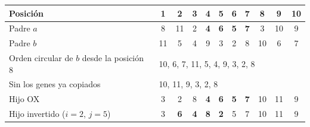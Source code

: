 \begin{tabular}{l*{10}{c}}\toprule
Posición & 1 & 2 & 3 & 4 & 5 & 6 & 7 & 8 & 9 & 10\\\midrule
Padre $a$ & 8 & 11 & 2 & \textbf{4} & \textbf{6} & \textbf{5} & \textbf{7} & 3 & 10 & 9\\
Padre $b$ & 11 & 5 & 4 & 9 & 3 & 2 & 8 & 10 & 6 & 7\\
Orden circular de $b$ desde la posición 8 & \multicolumn{10}{l}{10, 6, 7, 11, 5, 4, 9, 3, 2, 8}\\
Sin los genes ya copiados & \multicolumn{10}{l}{10, 11, 9, 3, 2, 8}\\
Hijo OX & 3 & 2 & 8 & \textbf{4} & \textbf{6} & \textbf{5} & \textbf{7} & 10 & 11 & 9\\
Hijo invertido ($i=2$, $j=5$) & 3 & \textbf{6} & \textbf{4} & \textbf{8} & \textbf{2} & 5 & 7 & 10 & 11 & 9\\
\bottomrule\end{tabular}
